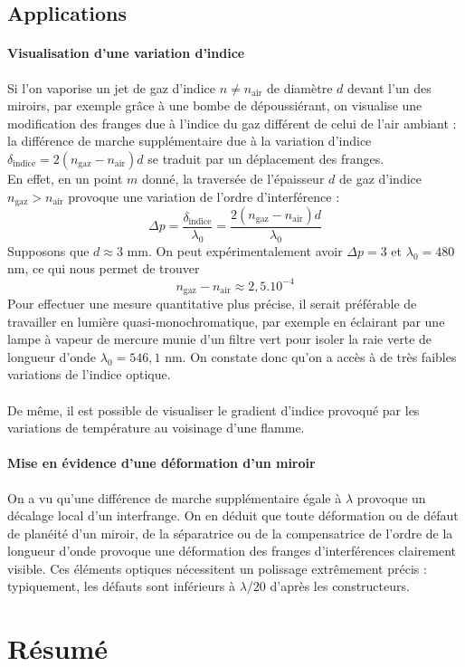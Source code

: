 \documentclass[french]{book}
\theoremstyle{plain}
\theoremstyle{definition}
\theoremstyle{remark}
\begin{document}
\subsection{Applications}
\paragraph{Visualisation d'une variation d'indice}
Si l'on vaporise un jet de gaz d'indice $n\ne n_{\text{air}}$ de diamètre $d$ devant l'un des miroirs, par exemple grâce à une bombe de dépoussiérant, on visualise une modification des franges due à l'indice du gaz différent de celui de l'air ambiant : la différence de marche supplémentaire due à la variation d'indice $\delta_\text{indice}=2(n_{\text{gaz}}-n_\text{air})d$ se traduit par un déplacement des franges. \\ En effet, en un point $m$ donné, la traversée de l'épaisseur $d$ de gaz d'indice $n_\text{gaz}>n_\text{air}$ provoque une variation de l'ordre d'interférence : $$\Delta p=\frac{\delta_\text{indice}}{\lambda_0}=\frac{2(n_\text{gaz}-n_\text{air})d}{\lambda_0}$$ Supposons que $d\approx3$ mm. On peut expérimentalement avoir $\Delta p=3$ et $\lambda_0=480$ nm, ce qui nous permet de trouver $$n_\text{gaz}-n_\text{air}\approx 2,5.10^{-4}$$ Pour effectuer une mesure quantitative plus précise, il serait préférable de travailler en lumière quasi-monochromatique, par exemple en éclairant par une lampe à vapeur de mercure munie d'un filtre vert pour isoler la raie verte de longueur d'onde $\lambda_0=546,1$ nm. On constate donc qu'on a accès à de très faibles variations de l'indice optique. \\ \\  De même, il est possible de visualiser le gradient d'indice provoqué par les variations de température au voisinage d'une flamme.
\paragraph{Mise en évidence d'une déformation d'un miroir} On a vu qu'une différence de marche supplémentaire égale à $\lambda$ provoque un décalage local d'un interfrange. On en déduit que toute déformation ou de défaut de planéité d'un miroir, de la séparatrice ou de la compensatrice de l'ordre de la longueur d'onde provoque une déformation des franges d'interférences clairement visible. Ces éléments optiques nécessitent un polissage extrêmement précis : typiquement, les défauts sont inférieurs à $\lambda/20$ d'après les constructeurs.
\section{Résumé}
\end{document}
